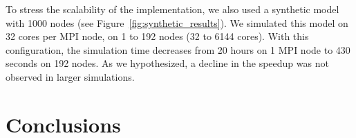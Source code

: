 \documentclass[times, twoside]{zHenriquesLab-StyleBioRxiv}
\begin{document}
To stress the scalability of the implementation, we also used a synthetic model with 1000 nodes (see Figure~\ref{fig:synthetic_results}). We simulated this model on 32 cores per MPI node, on 1 to 192 nodes (32 to 6144 cores). With this configuration, the simulation time decreases from 20 hours on 1 MPI node to 430 seconds on 192 nodes. As we hypothesized, a decline in the speedup was not observed in larger simulations. 






\section*{Conclusions}
\end{document}
